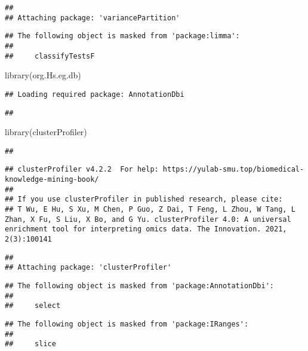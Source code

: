\documentclass[
]{article}
\newenvironment{Shaded}{\begin{snugshade}}{\end{snugshade}}
\newcommand{\FunctionTok}[1]{\textcolor[rgb]{0.00,0.00,0.00}{#1}}
\newcommand{\NormalTok}[1]{#1}
\begin{document}
\begin{verbatim}
## 
## Attaching package: 'variancePartition'
\end{verbatim}

\begin{verbatim}
## The following object is masked from 'package:limma':
## 
##     classifyTestsF
\end{verbatim}

\begin{Shaded}
\begin{Highlighting}[]
\FunctionTok{library}\NormalTok{(org.Hs.eg.db)}
\end{Highlighting}
\end{Shaded}

\begin{verbatim}
## Loading required package: AnnotationDbi
\end{verbatim}

\begin{verbatim}
## 
\end{verbatim}

\begin{Shaded}
\begin{Highlighting}[]
\FunctionTok{library}\NormalTok{(clusterProfiler)}
\end{Highlighting}
\end{Shaded}

\begin{verbatim}
## 
\end{verbatim}

\begin{verbatim}
## clusterProfiler v4.2.2  For help: https://yulab-smu.top/biomedical-knowledge-mining-book/
## 
## If you use clusterProfiler in published research, please cite:
## T Wu, E Hu, S Xu, M Chen, P Guo, Z Dai, T Feng, L Zhou, W Tang, L Zhan, X Fu, S Liu, X Bo, and G Yu. clusterProfiler 4.0: A universal enrichment tool for interpreting omics data. The Innovation. 2021, 2(3):100141
\end{verbatim}

\begin{verbatim}
## 
## Attaching package: 'clusterProfiler'
\end{verbatim}

\begin{verbatim}
## The following object is masked from 'package:AnnotationDbi':
## 
##     select
\end{verbatim}

\begin{verbatim}
## The following object is masked from 'package:IRanges':
## 
##     slice
\end{verbatim}
\end{document}
